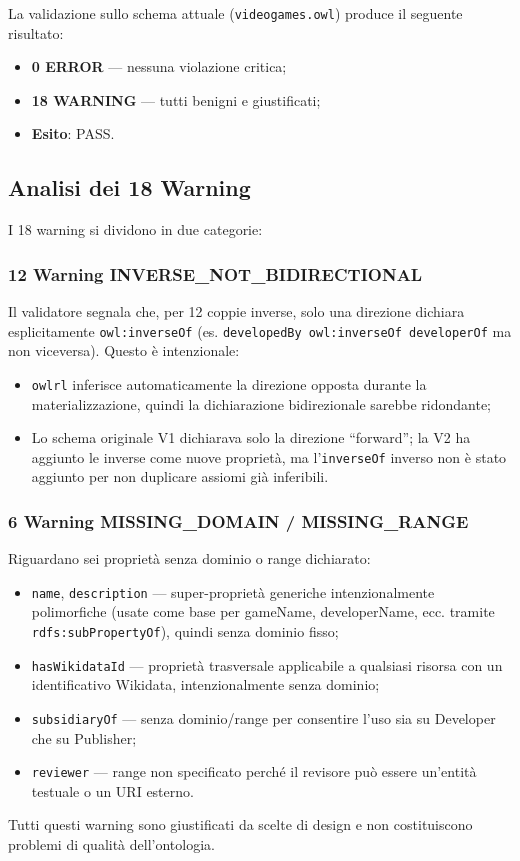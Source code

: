 La validazione sullo schema attuale (\texttt{videogames.owl}) produce il seguente
risultato:

\begin{itemize}[nosep]
  \item \textbf{0 ERROR} --- nessuna violazione critica;
  \item \textbf{18 WARNING} --- tutti benigni e giustificati;
  \item \textbf{Esito}: PASS.
\end{itemize}

\subsection{Analisi dei 18 Warning}

I 18 warning si dividono in due categorie:

\subsubsection{12 Warning INVERSE\_NOT\_BIDIRECTIONAL}

Il validatore segnala che, per 12 coppie inverse, solo una direzione dichiara
esplicitamente \texttt{owl:inverseOf} (es. \texttt{developedBy owl:inverseOf developerOf}
ma non viceversa). Questo \`e intenzionale:
\begin{itemize}[nosep]
  \item \texttt{owlrl} inferisce automaticamente la direzione opposta durante la
    materializzazione, quindi la dichiarazione bidirezionale sarebbe ridondante;
  \item Lo schema originale V1 dichiarava solo la direzione ``forward''; la V2 ha
    aggiunto le inverse come nuove propriet\`a, ma l'\texttt{inverseOf} inverso
    non \`e stato aggiunto per non duplicare assiomi gi\`a inferibili.
\end{itemize}

\subsubsection{6 Warning MISSING\_DOMAIN / MISSING\_RANGE}

Riguardano sei propriet\`a senza dominio o range dichiarato:
\begin{itemize}[nosep]
  \item \texttt{name}, \texttt{description} --- super-propriet\`a generiche
    intenzionalmente polimorfiche (usate come base per gameName, developerName,
    ecc. tramite \texttt{rdfs:subPropertyOf}), quindi senza dominio fisso;
  \item \texttt{hasWikidataId} --- propriet\`a trasversale applicabile a qualsiasi
    risorsa con un identificativo Wikidata, intenzionalmente senza dominio;
  \item \texttt{subsidiaryOf} --- senza dominio/range per consentire l'uso sia
    su Developer che su Publisher;
  \item \texttt{reviewer} --- range non specificato perch\'e il revisore pu\`o
    essere un'entit\`a testuale o un URI esterno.
\end{itemize}

Tutti questi warning sono giustificati da scelte di design e non costituiscono
problemi di qualit\`a dell'ontologia.
